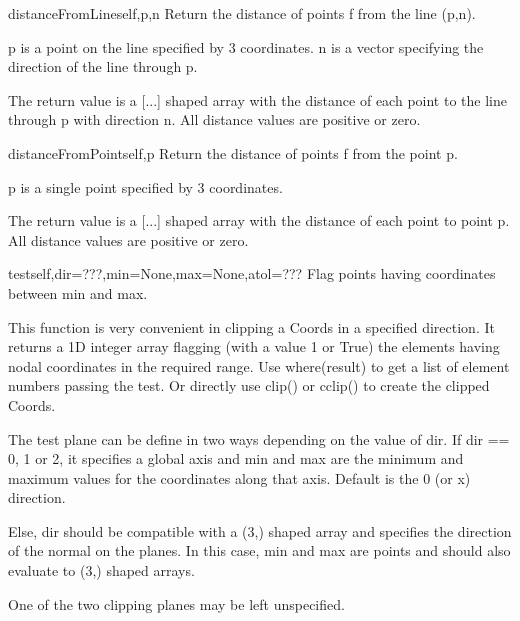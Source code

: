 \begin{funcdesc}{distanceFromLine}{self,p,n}
Return the distance of points f from the line (p,n).

        p is a point on the line specified by 3 coordinates.
        n is a vector specifying the direction of the line through p.

        The return value is a [...] shaped array with the distance of
        each point to the line through p with direction n.
        All distance values are positive or zero.
        
\end{funcdesc}

\begin{funcdesc}{distanceFromPoint}{self,p}
Return the distance of points f from the point p.

        p is a single point specified by 3 coordinates.

        The return value is a [...] shaped array with the distance of
        each point to point p.
        All distance values are positive or zero.
        
\end{funcdesc}

\begin{funcdesc}{test}{self,dir=???,min=None,max=None,atol=???}
Flag points having coordinates between min and max.

        This function is very convenient in clipping a Coords in a specified
        direction. It returns a 1D integer array flagging (with a value 1 or
        True) the elements having nodal coordinates in the required range.
        Use where(result) to get a list of element numbers passing the test.
        Or directly use clip() or cclip() to create the clipped Coords.
        
        The test plane can be define in two ways depending on the value of dir.
        If dir == 0, 1 or 2, it specifies a global axis and min and max are
        the minimum and maximum values for the coordinates along that axis.
        Default is the 0 (or x) direction.

        Else, dir should be compatible with a (3,) shaped array and specifies
        the direction of the normal on the planes. In this case, min and max
        are points and should also evaluate to (3,) shaped arrays.

        One of the two clipping planes may be left unspecified.
        
\end{funcdesc}

